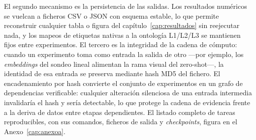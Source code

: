 El segundo mecanismo es la persistencia de las salidas. Los
resultados numéricos se vuelcan a ficheros CSV o JSON con esquema
estable, lo que permite reconstruir cualquier tabla o figura del
capítulo~\ref{cap:resultados} sin reejecutar nada, y los mapeos de
etiquetas nativas a la ontología L1/L2/L3 se mantienen fijos entre
experimentos. El tercero es la integridad de la cadena de cómputo:
cuando un experimento toma como entrada la salida de otro ---por
ejemplo, los \emph{embeddings} del sondeo lineal alimentan la rama
visual del zero-shot---, la identidad de esa entrada se preserva
mediante hash MD5 del fichero. El encadenamiento por hash convierte
el conjunto de experimentos en un grafo de dependencias verificable:
cualquier alteración silenciosa de una entrada intermedia
invalidaría el hash y sería detectable, lo que protege la cadena de
evidencia frente a la deriva de datos entre etapas dependientes. El
listado completo de tareas reproducibles, con sus comandos, ficheros
de salida y \emph{checkpoints}, figura en el
Anexo~\ref{cap:anexoa}.
